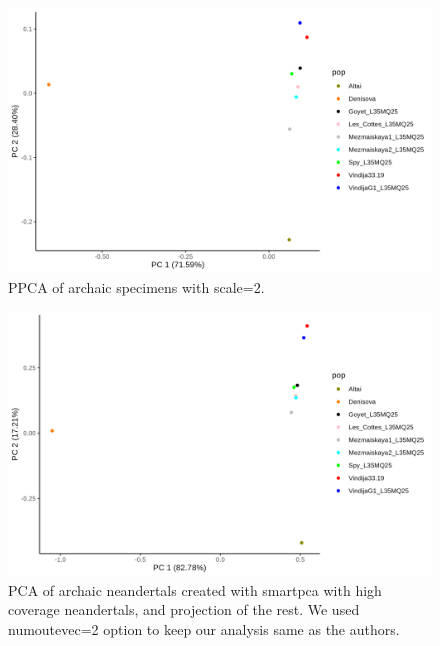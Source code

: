 \documentclass[12pt, letterpaper]{article}
\begin{document}
\begin{figure}[ht!]
    \includegraphics[width=16.5cm]{plots/neandertal_ppca.png}
    \centering
    \caption{PPCA of archaic specimens with scale=2.}
    \label{figS:ppca_nea}
\end{figure}

\begin{figure}[ht!]
    \includegraphics[width=16.5cm]{plots/neandertal_pca_smartpca.png}
    \centering
    \caption{PCA of archaic neandertals created with smartpca with high coverage neandertals, and projection of the rest. We used numoutevec=2 option to keep our analysis same as the authors.}
    \label{figS:smartpca_nea}
\end{figure}


\iffalse
\end{document}
